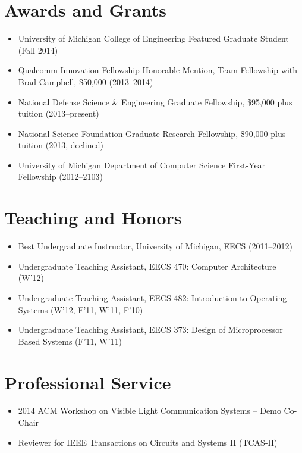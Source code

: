 \documentclass{article}
\begin{document}
\section*{Awards and Grants}

\begin{itemize}

  \item[] University of Michigan College of Engineering Featured Graduate Student (Fall 2014)
  \item[] Qualcomm Innovation Fellowship Honorable Mention, Team Fellowship with Brad Campbell, \$50,000 (2013--2014)
  \item[] National Defense Science \& Engineering Graduate Fellowship, \$95,000 plus tuition (2013--present)
  \item[] National Science Foundation Graduate Research Fellowship, \$90,000 plus tuition (2013, declined)
  \item[] University of Michigan Department of Computer Science First-Year Fellowship (2012--2103)

\end{itemize}

\section*{Teaching and Honors}

\begin{itemize}

  \item[] Best Undergraduate Instructor, University of Michigan, EECS (2011--2012)
  \item[] Undergraduate Teaching Assistant, EECS 470: Computer Architecture (W'12)
  \item[] Undergraduate Teaching Assistant, EECS 482: Introduction to Operating Systems (W'12, F'11, W'11, F'10)
  \item[] Undergraduate Teaching Assistant, EECS 373: Design of Microprocessor Based Systems (F'11, W'11)

\end{itemize}

\section*{Professional Service}

\begin{itemize}

  \item[] 2014 ACM Workshop on Visible Light Communication Systems -- Demo Co-Chair
  \item[] Reviewer for IEEE Transactions on Circuits and Systems II (TCAS-II)

\end{itemize}
\end{document}
